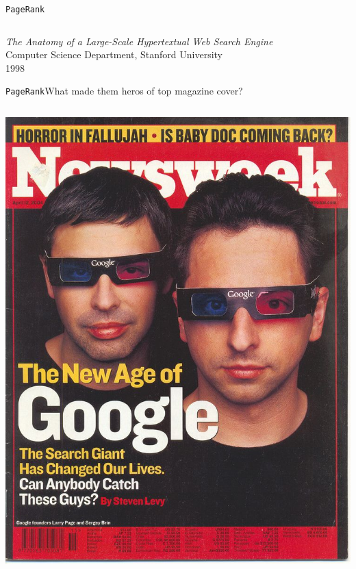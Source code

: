 \documentclass[xcolor=table,final]{beamer} %
\newcommand{\PageRank}{\texttt{PageRank}\xspace}
\begin{document}
\begin{frame}{\PageRank}
\begin{columns}
\begin{center}
\end{center}
  \end{columns}

  \begin{center}
    \textit{The Anatomy of a Large-Scale Hypertextual Web Search Engine} \\
    Computer Science Department, Stanford University \\
    1998
  \end{center}
% 
\end{frame}
\begin{frame}{\PageRank}{What made them heros of top magazine cover?}
  \begin{columns}
    \includegraphics[width=1.\textwidth]{figs/extras/brin-page-newsweek1}


\end{columns}
\end{frame}
\end{document}
